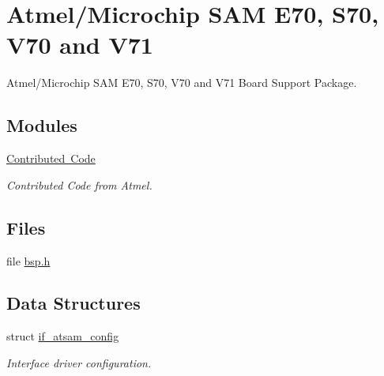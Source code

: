 \hypertarget{group__RTEMSBSPsARMAtsam}{}\section{Atmel/\+Microchip S\+AM E70, S70, V70 and V71}
\label{group__RTEMSBSPsARMAtsam}


Atmel/\+Microchip S\+AM E70, S70, V70 and V71 Board Support Package.  


\subsection*{Modules}
\begin{DoxyCompactItemize}
\item 
\mbox{\hyperlink{group__RTEMSBSPsARMAtsamContrib}{Contributed Code}}
\begin{DoxyCompactList}\small\item\em Contributed Code from Atmel. \end{DoxyCompactList}\end{DoxyCompactItemize}
\subsection*{Files}
\begin{DoxyCompactItemize}
\item 
file \mbox{\hyperlink{bsps_2arm_2atsam_2include_2bsp_8h}{bsp.\+h}}
\end{DoxyCompactItemize}
\subsection*{Data Structures}
\begin{DoxyCompactItemize}
\item 
struct \mbox{\hyperlink{structif__atsam__config}{if\+\_\+atsam\+\_\+config}}
\begin{DoxyCompactList}\small\item\em Interface driver configuration. \end{DoxyCompactList}\end{DoxyCompactItemize}
